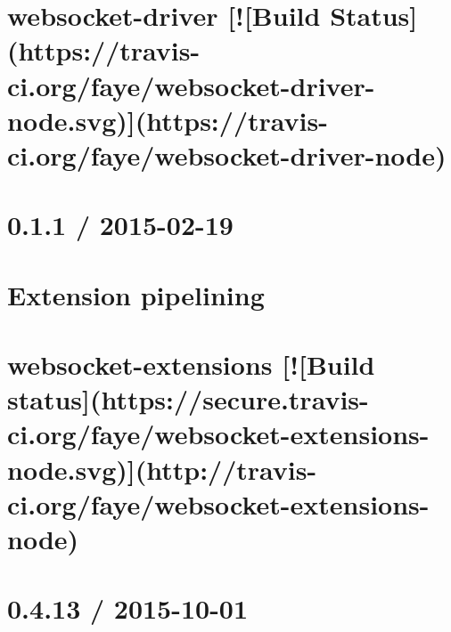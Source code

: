 \documentclass[twoside]{book}
\newcommand{\+}{\discretionary{\mbox{\scriptsize$\hookleftarrow$}}{}{}}
\begin{document}
\chapter{websocket-\/driver \mbox{[}!\mbox{[}Build Status\mbox{]}(https\+://travis-\/ci.org/faye/websocket-\/driver-\/node.svg)\mbox{]}(https\+://travis-\/ci.org/faye/websocket-\/driver-\/node)}
\label{md__c_1_workspace_demo_src_main_script_node_modules_websocket-driver__r_e_a_d_m_e}

\chapter{0.1.1 / 2015-\/02-\/19}
\label{md__c_1_workspace_demo_src_main_script_node_modules_websocket-extensions__c_h_a_n_g_e_l_o_g}

\chapter{Extension pipelining}
\label{md__c_1_workspace_demo_src_main_script_node_modules_websocket-extensions_lib_pipeline__r_e_a_d_m_e}

\chapter{websocket-\/extensions \mbox{[}!\mbox{[}Build status\mbox{]}(https\+://secure.travis-\/ci.org/faye/websocket-\/extensions-\/node.svg)\mbox{]}(http\+://travis-\/ci.org/faye/websocket-\/extensions-\/node)}
\label{md__c_1_workspace_demo_src_main_script_node_modules_websocket-extensions__r_e_a_d_m_e}

\chapter{0.4.13 / 2015-\/10-\/01}
\label{md__c_1_workspace_demo_src_main_script_node_modules_whatwg-encoding_node_modules_iconv-lite__changelog}

\end{document}
